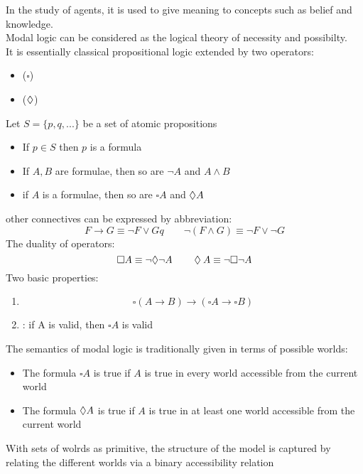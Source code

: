 In the study of agents, it is used to give meaning to concepts such as belief and knowledge.\\
Modal logic can be considered as the logical theory of necessity and possibilty.\\
It is essentially classical propositional logic extended by two operators:
\begin{itemize}
\item {} ($\square$)
\item {} ($\mathbin{\Diamond}$)
\end{itemize}
Let $S=\{p,q,...\}$ be a set of atomic propositions
\begin{itemize}
\item If $p\in S$ then $p$ is a formula
\item If $A, B$ are formulae, then so are $\neg{A}$ and $A \land B$
\item if $A$ is a formulae, then so are $\square A$ and $\mathbin{\Diamond} A$
\end{itemize}
other connectives can be expressed by abbreviation:
\[F\rightarrow G \equiv \neg{F} \lor G q\qquad \neg{(F\land G)} \equiv \neg{F} \lor \neg{G}\]
The duality of operators:
\[\square A \equiv \neg{\mathbin{\Diamond}} \neg{A}\qquad \mathbin{\Diamond} A \equiv \neg{\square} \neg{A}\]
Two basic properties:
\begin{enumerate}
\item {}
\[\square (A\rightarrow B ) \rightarrow (\square A \rightarrow \square B)\]
\item {}: if A is valid, then $\square A$ is valid
\end{enumerate}

The semantics of modal logic is traditionally given in terms of possible worlds:
\begin{itemize}
\item The formula $\square A$ is true if $A$ is true in every world accessible from the current world
\item The formula $\mathbin{\Diamond} A$ is true if $A$ is true in at least one world accessible from the current world
\end{itemize}
With sets of wolrds as primitive, the structure of the model is captured by relating the different worlds via a binary accessibility relation

